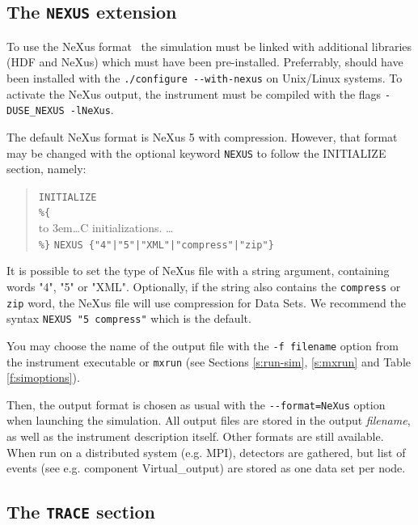\subsection{The \texttt{NEXUS} extension}
   
\label{s:nexus}

To use the NeXus format~\cite{nexus_webpage} the simulation must be linked with additional libraries (HDF and NeXus) which must have been pre-installed. Preferrably, \MCX should
have been installed with the \verb+./configure --with-nexus+ on Unix/Linux systems. To activate the NeXus output, the instrument must be compiled with the flags
\verb+-DUSE_NEXUS -lNeXus+.

The default NeXus format is NeXus 5 with compression. However, that format may be changed with the optional keyword \verb+NEXUS+ to follow the INITIALIZE section, namely:

\begin{quote}
  \texttt{INITIALIZE} \\
  \verb|%{| \\
  \hbox to 3em{}\ldots C initializations. \ldots \\
  \verb|%}|
  \verb+NEXUS {"4"|"5"|"XML"|"compress"|"zip"}+
\end{quote}

It is possible to set the type of NeXus file with a string argument, containing words "4", "5" or "XML". Optionally, if the string also contains the \verb+compress+ or \verb+zip+
word, the NeXus file will use compression for Data Sets. We recommend the syntax \verb+NEXUS "5 compress"+ which is the default.

You may choose the name of the output file with the \verb+-f filename+ option from the instrument executable or \verb+mxrun+ (see Sections \ref{s:run-sim}, \ref{s:mxrun} and Table
\ref{f:simoptions}).

Then, the output format is chosen as usual with the \verb+--format=NeXus+ option when launching the simulation. All output files are stored in the output \textit{filename}, as well
as the instrument description itself. Other formats are still available. When run on a distributed system (e.g. MPI), detectors are gathered, but list of events (see e.g. component
Virtual\_output) are stored as one data set per node.

\subsection{The \texttt{TRACE} section}
\label{s:trace}


